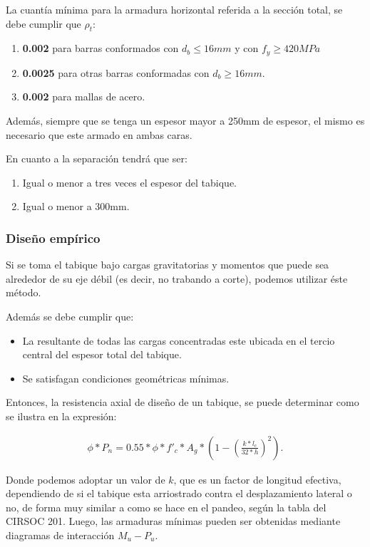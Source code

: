 \documentclass[../main.tex]{subfiles}
\begin{document}
La cuantía mínima para la armadura horizontal referida a la sección total, se
debe cumplir que $\rho_t$:

\begin{enumerate}
  \item \textbf{0.002} para barras conformados con $d_b \leq 16mm$ y con
    $f_y \geq 420MPa$
  \item \textbf{0.0025} para otras barras conformadas con $d_b \geq 16mm$.
  \item \textbf{0.002} para mallas de acero.
\end{enumerate}

Además, siempre que se tenga un espesor mayor a 250mm de espesor, el mismo
es necesario que este armado en ambas caras.

En cuanto a la separación tendrá que ser:

\begin{enumerate}
  \item Igual o menor a tres veces el espesor del tabique.
  \item Igual o menor a 300mm.
\end{enumerate}

\subsubsection{Diseño empírico}

Si se toma el tabique bajo cargas gravitatorias y momentos que puede sea
alrededor de su eje débil (es decir, no trabando a corte), podemos utilizar
éste método.

Además se debe cumplir que:


\begin{itemize}
  \item La resultante de todas las cargas concentradas este ubicada en el tercio
  central del espesor total del tabique.
  \item Se satisfagan condiciones geométricas mínimas.
\end{itemize}

Entonces, la resistencia axial de diseño de un tabique, se puede determinar como
se ilustra en la expresión:

\begin{align*}
  \phi * P_n = 0.55 * \phi * f'_c * A_g * \left( 1 - \left( \frac{k*l_c}{32*h} \right)^{2}  \right) 
.\end{align*}

Donde podemos adoptar un valor de $k$, que es un factor de longitud efectiva,
dependiendo de si el tabique esta arriostrado contra el desplazamiento lateral o
no, de forma muy similar a como se hace en el pandeo, según la tabla del 
CIRSOC 201. Luego, las armaduras mínimas pueden ser obtenidas mediante 
diagramas de interacción  $M_u - P_u$.
\end{document}
